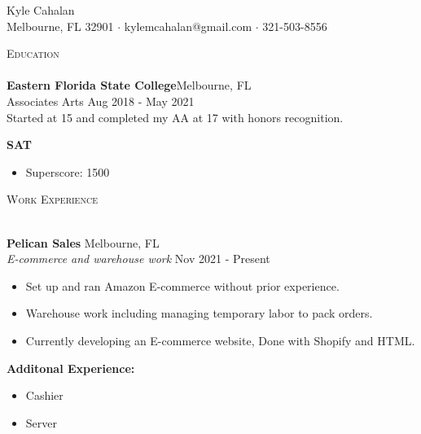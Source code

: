 \documentclass[a4paper]{article}
\newcommand{\lineunder} {
    \vspace*{-8pt} \\
    \hspace*{-18pt} \hrulefill \\
}
\newcommand{\header} [1] {
    {\hspace*{-18pt}\vspace*{6pt} \textsc{#1}}
    \vspace*{-6pt} \lineunder
}
\begin{document}
	\vspace*{-40pt}

		

	\vspace*{-10pt}
	\begin{flushleft}
		{\Huge{Kyle Cahalan}}\\
		Melbourne, FL 32901 $\cdot$ kylemcahalan@gmail.com $\cdot$ 321-503-8556\\
	\end{flushleft}


	\header{Education}
	\textbf{Eastern Florida State College}\hfill Melbourne, FL\\
	Associates Arts  \hfill Aug 2018 - May 2021\\
	Started at 15 and completed my AA at 17 with honors recognition.\\
	\vspace{2mm}

	\textbf{SAT}
	\vspace{-2mm}
	\begin{itemize} \itemsep 1pt
		\item Superscore: 1500
	\end{itemize}



	\header{Work Experience}
	\vspace{1mm}

	\textbf{Pelican Sales} \hfill Melbourne, FL\\
	\textit{E-commerce and warehouse work} \hfill Nov 2021 - Present\\
	\vspace{-1mm}
	\begin{itemize} \itemsep 1pt
		\item Set up and ran Amazon E-commerce without prior experience.
		\item Warehouse work including managing temporary labor to pack orders.
		\item Currently developing an E-commerce website, Done with Shopify and HTML.
	\end{itemize}
	\textbf{Additonal Experience:} \\
	\vspace{-1mm}
	\begin{itemize} \itemsep 1pt
		\item Cashier
		\item Server
	\end{itemize}
\end{document}
